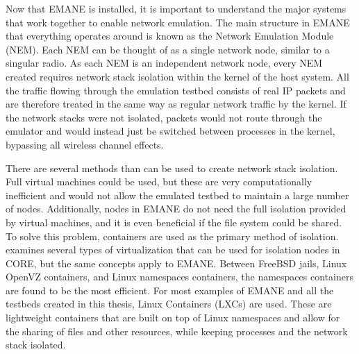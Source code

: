 Now that EMANE is installed, it is important to understand the major systems that work together to enable network emulation.
The main structure in EMANE that everything operates around is known as the Network Emulation Module (NEM).
Each NEM can be thought of as a single network node, similar to a singular radio.
As each NEM is an independent network node, every NEM created requires network stack isolation within the kernel of the host system.
All the traffic flowing through the emulation testbed consists of real IP packets and are therefore treated in the same way as regular network traffic by the kernel.
If the network stacks were not isolated, packets would not route through the emulator and would instead just be switched between processes in the kernel, bypassing all wireless channel effects.\par
There are several methods than can be used to create network stack isolation.
Full virtual machines could be used, but these are very computationally inefficient and would not allow the emulated testbed to maintain a large number of nodes.
Additionally, nodes in EMANE do not need the full isolation provided by virtual machines, and it is even beneficial if the file system could be shared.
To solve this problem, containers are used as the primary method of isolation.
\cite{core_containers} examines several types of virtualization that can be used for isolation nodes in CORE, but the same concepts apply to EMANE.
Between FreeBSD jails, Linux OpenVZ containers, and Linux namespaces containers, the namespaces containers are found to be the most efficient.
For most examples of EMANE and all the testbeds created in this thesis, Linux Containers (LXCs) are used.
These are lightweight containers that are built on top of Linux namespaces and allow for the sharing of files and other resources, while keeping processes and the network stack isolated.\par

